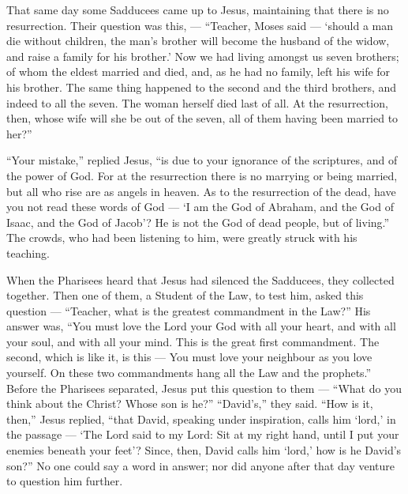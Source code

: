  That same day some Sadducees came up to Jesus, maintaining
that there is no resurrection. Their question was this, ---
 ``Teacher, Moses said --- `should a man die without
children, the man's brother will become the husband of the widow, and
raise a family for his brother.'  Now we had living amongst
us seven brothers; of whom the eldest married and died, and, as he had
no family, left his wife for his brother.  The same thing
happened to the second and the third brothers, and indeed to all the
seven.  The woman herself died last of all. 
At the resurrection, then, whose wife will she be out of the seven, all
of them having been married to her?''

 ``Your mistake,'' replied Jesus, ``is due to your
ignorance of the scriptures, and of the power of God.  For
at the resurrection there is no marrying or being married, but all who
rise are as angels in heaven.  As to the resurrection of
the dead, have you not read these words of God ---  `I am
the God of Abraham, and the God of Isaac, and the God of Jacob'? He is
not the God of dead people, but of living.''  The crowds,
who had been listening to him, were greatly struck with his teaching.

 When the Pharisees heard that Jesus had silenced the
Sadducees, they collected together.  Then one of them, a
Student of the Law, to test him, asked this question --- 
``Teacher, what is the greatest commandment in the Law?'' 
His answer was, ``You must love the Lord your God with all your heart,
and with all your soul, and with all your mind.  This is
the great first commandment.  The second, which is like it,
is this --- You must love your neighbour as you love yourself.
 On these two commandments hang all the Law and the
prophets.''  Before the Pharisees separated, Jesus put this
question to them ---  ``What do you think about the Christ?
Whose son is he?'' ``David's,'' they said.  ``How is it,
then,'' Jesus replied, ``that David, speaking under inspiration, calls
him `lord,' in the passage ---  `The Lord said to my Lord:
Sit at my right hand, until I put your enemies beneath your feet'?
 Since, then, David calls him `lord,' how is he David's
son?''  No one could say a word in answer; nor did anyone
after that day venture to question him further.

